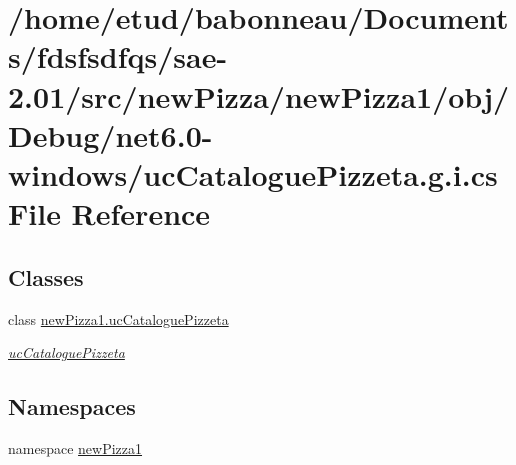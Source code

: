 \hypertarget{net6_80-windows_2ucCataloguePizzeta_8g_8i_8cs}{}\section{/home/etud/babonneau/\+Documents/fdsfsdfqs/sae-\/2.01/src/new\+Pizza/new\+Pizza1/obj/\+Debug/net6.0-\/windows/uc\+Catalogue\+Pizzeta.g.\+i.\+cs File Reference}
\label{net6_80-windows_2ucCataloguePizzeta_8g_8i_8cs}
\subsection*{Classes}
\begin{DoxyCompactItemize}
\item 
class \hyperlink{classnewPizza1_1_1ucCataloguePizzeta}{new\+Pizza1.\+uc\+Catalogue\+Pizzeta}
\begin{DoxyCompactList}\small\item\em \hyperlink{classnewPizza1_1_1ucCataloguePizzeta}{uc\+Catalogue\+Pizzeta} \end{DoxyCompactList}\end{DoxyCompactItemize}
\subsection*{Namespaces}
\begin{DoxyCompactItemize}
\item 
namespace \hyperlink{namespacenewPizza1}{new\+Pizza1}
\end{DoxyCompactItemize}
